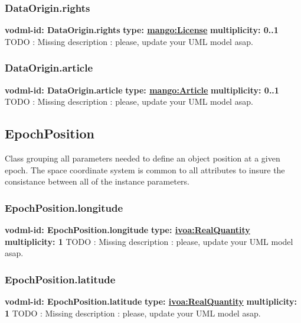     \subsubsection{DataOrigin.rights}
      \textbf{vodml-id: DataOrigin.rights} \newline
      \textbf{type: \hyperref[sect:License]{mango:License}} \newline
      \textbf{multiplicity: 0..1} \newline
      TODO : Missing description : please, update your UML model asap.

    \subsubsection{DataOrigin.article}
      \textbf{vodml-id: DataOrigin.article} \newline
      \textbf{type: \hyperref[sect:Article]{mango:Article}} \newline
      \textbf{multiplicity: 0..1} \newline
      TODO : Missing description : please, update your UML model asap.

  \subsection{EpochPosition}
  \label{sect:EpochPosition}
    Class grouping all parameters needed to define an object position at a given epoch. The space coordinate system is common to all attributes to insure the consistance between all of the instance parameters.

    \subsubsection{EpochPosition.longitude}
      \textbf{vodml-id: EpochPosition.longitude} \newline
      \textbf{type: \hyperref[sect:ivoa]{ivoa:RealQuantity}} \newline
      \textbf{multiplicity: 1} \newline
      TODO : Missing description : please, update your UML model asap.

    \subsubsection{EpochPosition.latitude}
      \textbf{vodml-id: EpochPosition.latitude} \newline
      \textbf{type: \hyperref[sect:ivoa]{ivoa:RealQuantity}} \newline
      \textbf{multiplicity: 1} \newline
      TODO : Missing description : please, update your UML model asap.

